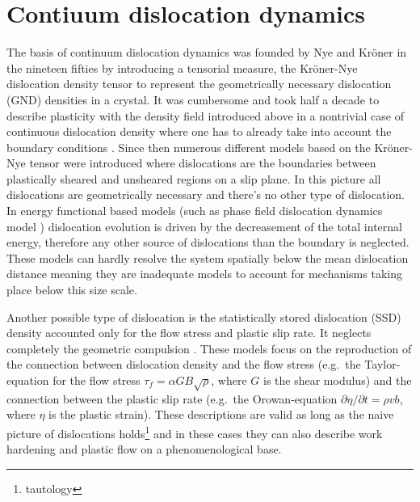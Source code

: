\section{Contiuum dislocation dynamics} \label{sec:disloc_sim_CDD}
The basis of continuum dislocation dynamics was founded by Nye and Kröner in the nineteen fifties by introducing a tensorial measure, the Kröner-Nye dislocation density tensor to represent the geometrically necessary dislocation (GND)  densities in a crystal. It was cumbersome and took half a decade to describe plasticity with the density field  introduced above in a nontrivial case of continuous dislocation density where one has to already take into account the boundary conditions \cite{doi:10.1080/14786436308213841}. Since then numerous different models based on the Kröner-Nye tensor were introduced \cite{Acharya_2001_JMPS, Le_2016_IJP, Sedlacek_2003_PM, Xia_2015_MSMSE} where dislocations are the boundaries between plastically sheared and unsheared regions on a slip plane. In this picture all dislocations are geometrically necessary and there's no other type of dislocation. In energy functional based models (such as phase field dislocation dynamics model \cite{Beyerlein20150166}) dislocation evolution is driven by the decreasement of the total internal energy, therefore any other source of dislocations than the boundary is neglected. These models can hardly resolve the system spatially below the mean dislocation distance meaning they are inadequate models to account for mechanisms taking place below this size scale.

Another possible type of dislocation is the statistically stored dislocation (SSD) density  accounted only for the flow stress and plastic slip rate. It neglects completely the geometric compulsion \cite{johnston_1959_JAP, Kocks_1976_JEMT}. These models focus on the reproduction of the connection between dislocation density and the flow stress (e.g.\ the Taylor-equation for the flow stress ${\tau _f} = \alpha GB\sqrt \rho  $, where $G$ is the shear modulus) and the connection between the plastic slip rate (e.g.\ the Orowan-equation $\partial \eta /\partial t = \rho vb$, where $\eta$ is the plastic strain). These descriptions are valid as long as the naive picture of dislocations holds\footnote{tautology} and in these cases they can also describe work hardening and plastic flow \cite{Bouaziz_2013_PM, Caceres_2007_MSEA, Estrin_1984_AM} on a phenomenological base.

